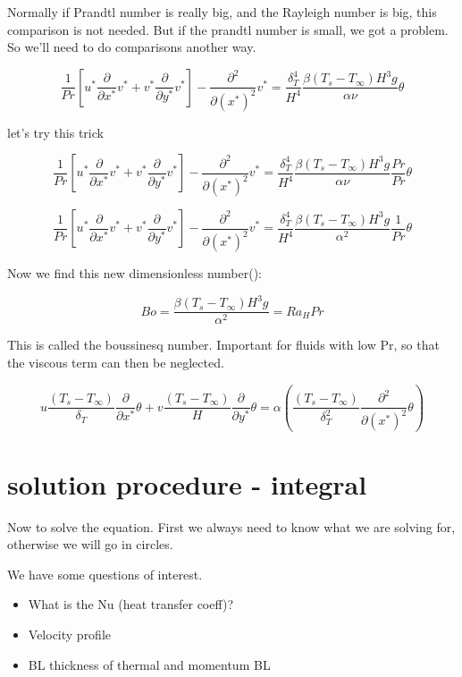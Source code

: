 \documentclass[11pt]{article}
\begin{document}
Normally if Prandtl number is really big, and the Rayleigh number is big, this comparison is not needed. But if the prandtl number is small, we got a problem. So we'll need to do comparisons another way.


$$ \frac{1}{Pr} \left[ u^* \frac{\partial}{\partial x^*} v^* +    v^* \frac{\partial}{\partial y^*} v^* \right] -   \frac{\partial^2}{\partial (x^*)^2} v^*  = \frac{\delta_T^4}{ H^4} \frac{\beta(T_s-T_\infty) H^3 g}{\alpha \nu}  \theta $$

let's try this trick

$$ \frac{1}{Pr} \left[ u^* \frac{\partial}{\partial x^*} v^* +    v^* \frac{\partial}{\partial y^*} v^* \right] -   \frac{\partial^2}{\partial (x^*)^2} v^*  = \frac{\delta_T^4}{ H^4} \frac{\beta(T_s-T_\infty) H^3 g}{\alpha \nu}  \frac{Pr}{Pr} \theta $$

$$ \frac{1}{Pr} \left[ u^* \frac{\partial}{\partial x^*} v^* +    v^* \frac{\partial}{\partial y^*} v^* \right] -   \frac{\partial^2}{\partial (x^*)^2} v^*  = \frac{\delta_T^4}{ H^4} \frac{\beta(T_s-T_\infty) H^3 g}{\alpha^2}  \frac{1}{Pr} \theta $$

Now we find this new dimensionless number(\cite{bejan2013convection}):

$$Bo=\frac{\beta(T_s-T_\infty) H^3 g}{\alpha^2}=Ra_H Pr$$

This is called the boussinesq number. Important for fluids with low Pr, so that the viscous term can then be neglected.


$$ u \frac{(T_s - T_\infty)}{\delta_T} \frac{\partial}{\partial x^*}\theta + v \frac{(T_s - T_\infty)}{H} \frac{\partial }{\partial y^*}  \theta  = \alpha ( \frac{(T_s - T_\infty)}{\delta_T^2} \frac{\partial^2}{\partial (x^*)^2} \theta ) $$ 

\section{solution procedure - integral}

Now to solve the equation. First we always need to know what we are solving for, otherwise we will go in circles.

We have some questions of interest.

\begin{itemize}
\item What is the Nu (heat transfer coeff)?
\item Velocity profile
\item BL thickness of thermal and momentum BL
\end{itemize}
\end{document}

